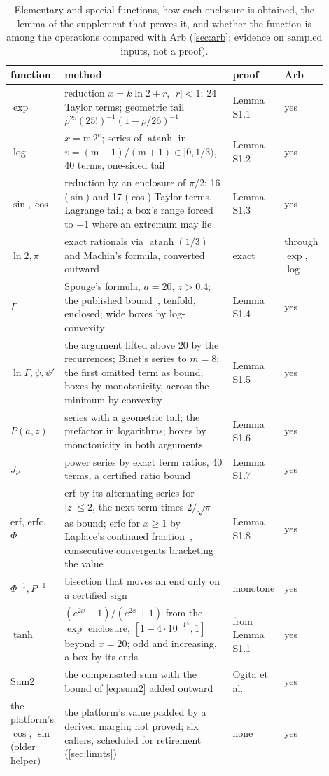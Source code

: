 \documentclass[preprint,11pt,a4paper]{elsarticle}
\theoremstyle{definition}
\begin{document}
\begin{table}[htbp]
\centering\footnotesize
\caption{Elementary and special functions, how each enclosure is obtained, the lemma of the supplement that proves it, and whether the function is among the \MtArbOps{} operations compared with Arb (\cref{sec:arb}; evidence on sampled inputs, not a proof).}
\label{tab:functions}
\setlength{\tabcolsep}{3pt}%
\begin{tabular}{@{}L{0.13\linewidth}L{0.57\linewidth}L{0.13\linewidth}L{0.07\linewidth}@{}}
\toprule
function & method & proof & Arb \\
\midrule
$\exp$ & reduction $x=k\ln 2+r$, $|r|<1$; 24 Taylor terms; geometric tail $\rho^{25}(25!)^{-1}(1-\rho/26)^{-1}$ & Lemma S1.1 & yes \\
$\log$ & $x=\mathrm{m}\,2^e$; series of $\operatorname{atanh}$ in $v=(\mathrm{m}-1)/(\mathrm{m}+1)\in[0,1/3)$, 40 terms, one-sided tail & Lemma S1.2 & yes \\
$\sin,\cos$ & reduction by an enclosure of $\pi/2$; 16 ($\sin$) and 17 ($\cos$) Taylor terms, Lagrange tail; a box's range forced to $\pm1$ where an extremum may lie & Lemma S1.3 & yes \\
$\ln 2,\pi$ & exact rationals via $\operatorname{atanh}(1/3)$ and Machin's formula, converted outward & exact & through $\exp$, $\log$ \\
$\Gamma$ & Spouge's formula, $a=20$, $z>0.4$; the published bound~\citep{Spouge94}, tenfold, enclosed; wide boxes by log-convexity & Lemma S1.4 & yes \\
$\ln\Gamma,\psi,\psi'$ & the argument lifted above 20 by the recurrences; Binet's series to $m=8$; the first omitted term as bound; boxes by monotonicity, across the minimum by convexity & Lemma S1.5 & yes \\
$P(a,z)$ & series with a geometric tail; the prefactor in logarithms; boxes by monotonicity in both arguments & Lemma S1.6 & yes \\
$J_\nu$ & power series by exact term ratios, 40 terms, a certified ratio bound & Lemma S1.7 & yes \\
erf, erfc, $\Phi$ & erf by its alternating series for $|z|\le2$, the next term times $2/\sqrt\pi$ as bound; erfc for $x\ge1$ by Laplace's continued fraction~\citep[7.9.2]{DLMF}, consecutive convergents bracketing the value~\citep{Cuyt08} & Lemma S1.8 & yes \\
$\Phi^{-1},P^{-1}$ & bisection that moves an end only on a certified sign & monotone & yes \\
$\tanh$ & $(e^{2x}-1)/(e^{2x}+1)$ from the $\exp$ enclosure, $[1-4\cdot10^{-17},1]$ beyond $x=20$; odd and increasing, a box by its ends & from Lemma S1.1 & yes \\
Sum2 & the compensated sum with the bound of \cref{eq:sum2} added outward & Ogita et al.~\citep[Prop.\ 4.5]{Ogita05} & yes \\
the platform's $\cos$, $\sin$ (older helper) & the platform's value padded by a derived margin; not proved; six callers, scheduled for retirement (\cref{sec:limits}) & none & yes \\
\bottomrule
\end{tabular}
\end{table}



\end{document}
